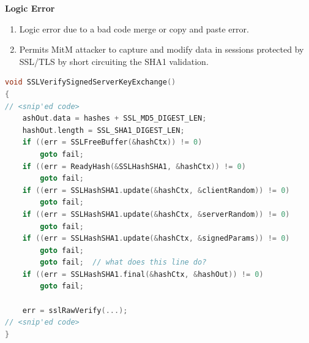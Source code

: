 \documentclass[12pt]{Training}
\begin{document}
\textbf{Logic Error}
\begin{enumerate}
    \item Logic error due to a bad code merge or copy and paste error.
    \item Permits MitM attacker to capture and modify data in sessions protected by SSL/TLS by short circuiting the SHA1 validation.
\end{enumerate}
\begin{sectionbox}
\begin{lstlisting}[language=C, caption={Logic Error}]
void SSLVerifySignedServerKeyExchange()
{
// <snip'ed code>
    ashOut.data = hashes + SSL_MD5_DIGEST_LEN;
    hashOut.length = SSL_SHA1_DIGEST_LEN;
    if ((err = SSLFreeBuffer(&hashCtx)) != 0)
        goto fail;
    if ((err = ReadyHash(&SSLHashSHA1, &hashCtx)) != 0)
        goto fail;
    if ((err = SSLHashSHA1.update(&hashCtx, &clientRandom)) != 0)
        goto fail;
    if ((err = SSLHashSHA1.update(&hashCtx, &serverRandom)) != 0)
        goto fail;
    if ((err = SSLHashSHA1.update(&hashCtx, &signedParams)) != 0)
        goto fail;
        goto fail;  // what does this line do?
    if ((err = SSLHashSHA1.final(&hashCtx, &hashOut)) != 0)
        goto fail;

    err = sslRawVerify(...);
// <snip'ed code>
}
\end{lstlisting}
\end{sectionbox}
\end{document}

